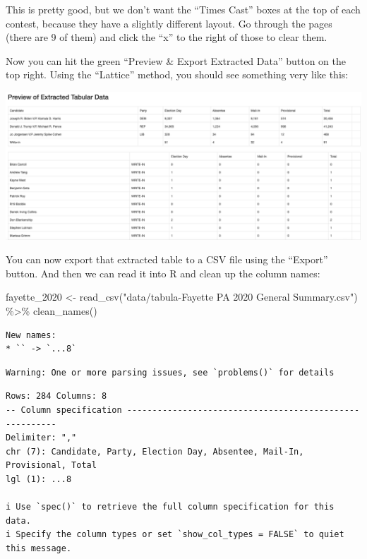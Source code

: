 \documentclass[
  letterpaper,
  DIV=11,
  numbers=noendperiod]{scrreprt}
\newenvironment{Shaded}{\begin{snugshade}}{\end{snugshade}}
\newcommand{\FunctionTok}[1]{\textcolor[rgb]{0.28,0.35,0.67}{#1}}
\newcommand{\NormalTok}[1]{\textcolor[rgb]{0.00,0.23,0.31}{#1}}
\newcommand{\OtherTok}[1]{\textcolor[rgb]{0.00,0.23,0.31}{#1}}
\newcommand{\SpecialCharTok}[1]{\textcolor[rgb]{0.37,0.37,0.37}{#1}}
\newcommand{\StringTok}[1]{\textcolor[rgb]{0.13,0.47,0.30}{#1}}
\begin{document}
This is pretty good, but we don't want the ``Times Cast'' boxes at the
top of each contest, because they have a slightly different layout. Go
through the pages (there are 9 of them) and click the ``x'' to the right
of those to clear them.

Now you can hit the green ``Preview \& Export Extracted Data'' button on
the top right. Using the ``Lattice'' method, you should see something
very like this:

\includegraphics{./images/fayette_3.png}

You can now export that extracted table to a CSV file using the
``Export'' button. And then we can read it into R and clean up the
column names:

\begin{Shaded}
\begin{Highlighting}[]
\NormalTok{fayette\_2020 }\OtherTok{\textless{}{-}} \FunctionTok{read\_csv}\NormalTok{(}\StringTok{"data/tabula{-}Fayette PA 2020 General Summary.csv"}\NormalTok{) }\SpecialCharTok{\%\textgreater{}\%} \FunctionTok{clean\_names}\NormalTok{()}
\end{Highlighting}
\end{Shaded}

\begin{verbatim}
New names:
* `` -> `...8`
\end{verbatim}

\begin{verbatim}
Warning: One or more parsing issues, see `problems()` for details
\end{verbatim}

\begin{verbatim}
Rows: 284 Columns: 8
-- Column specification --------------------------------------------------------
Delimiter: ","
chr (7): Candidate, Party, Election Day, Absentee, Mail-In, Provisional, Total
lgl (1): ...8

i Use `spec()` to retrieve the full column specification for this data.
i Specify the column types or set `show_col_types = FALSE` to quiet this message.
\end{verbatim}
\end{document}
